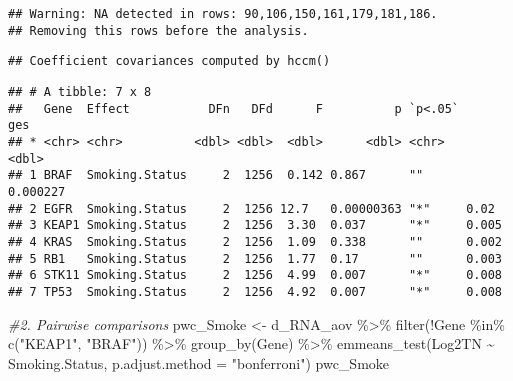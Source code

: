 \documentclass[
]{article}
\newenvironment{Shaded}{\begin{snugshade}}{\end{snugshade}}
\newcommand{\AttributeTok}[1]{\textcolor[rgb]{0.77,0.63,0.00}{#1}}
\newcommand{\CommentTok}[1]{\textcolor[rgb]{0.56,0.35,0.01}{\textit{#1}}}
\newcommand{\FunctionTok}[1]{\textcolor[rgb]{0.00,0.00,0.00}{#1}}
\newcommand{\NormalTok}[1]{#1}
\newcommand{\OtherTok}[1]{\textcolor[rgb]{0.56,0.35,0.01}{#1}}
\newcommand{\SpecialCharTok}[1]{\textcolor[rgb]{0.00,0.00,0.00}{#1}}
\newcommand{\StringTok}[1]{\textcolor[rgb]{0.31,0.60,0.02}{#1}}
\begin{document}
\begin{verbatim}
## Warning: NA detected in rows: 90,106,150,161,179,181,186.
## Removing this rows before the analysis.
\end{verbatim}

\begin{verbatim}
## Coefficient covariances computed by hccm()
\end{verbatim}

\begin{verbatim}
## # A tibble: 7 x 8
##   Gene  Effect           DFn   DFd      F          p `p<.05`      ges
## * <chr> <chr>          <dbl> <dbl>  <dbl>      <dbl> <chr>      <dbl>
## 1 BRAF  Smoking.Status     2  1256  0.142 0.867      ""      0.000227
## 2 EGFR  Smoking.Status     2  1256 12.7   0.00000363 "*"     0.02    
## 3 KEAP1 Smoking.Status     2  1256  3.30  0.037      "*"     0.005   
## 4 KRAS  Smoking.Status     2  1256  1.09  0.338      ""      0.002   
## 5 RB1   Smoking.Status     2  1256  1.77  0.17       ""      0.003   
## 6 STK11 Smoking.Status     2  1256  4.99  0.007      "*"     0.008   
## 7 TP53  Smoking.Status     2  1256  4.92  0.007      "*"     0.008
\end{verbatim}

\begin{Shaded}
\begin{Highlighting}[]
\CommentTok{\#2. Pairwise comparisons}
\NormalTok{pwc\_Smoke }\OtherTok{\textless{}{-}}\NormalTok{ d\_RNA\_aov }\SpecialCharTok{\%\textgreater{}\%} 
  \FunctionTok{filter}\NormalTok{(}\SpecialCharTok{!}\NormalTok{Gene }\SpecialCharTok{\%in\%} \FunctionTok{c}\NormalTok{(}\StringTok{"KEAP1"}\NormalTok{, }\StringTok{"BRAF"}\NormalTok{)) }\SpecialCharTok{\%\textgreater{}\%}
  \FunctionTok{group\_by}\NormalTok{(Gene) }\SpecialCharTok{\%\textgreater{}\%}
  \FunctionTok{emmeans\_test}\NormalTok{(Log2TN }\SpecialCharTok{\textasciitilde{}}\NormalTok{ Smoking.Status, }\AttributeTok{p.adjust.method =} \StringTok{"bonferroni"}\NormalTok{) }
\NormalTok{pwc\_Smoke}
\end{Highlighting}
\end{Shaded}
\end{document}
